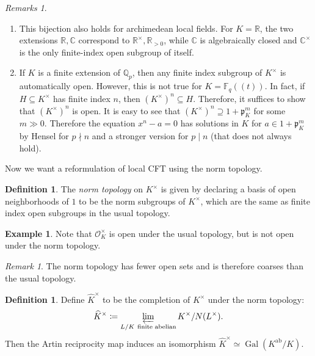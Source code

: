 \documentclass[leqno, openany]{memoir}
\theoremstyle{definition}
\newtheorem{defn}[thm]{Definition}
\newtheorem{exm}[thm]{Example}
\theoremstyle{remark}
\newtheorem{rmk}[thm]{Remark}
\newtheorem{rmks}[thm]{Remarks}
\theoremstyle{plain}
\theoremstyle{definition}
\theoremstyle{remark}
\newcommand{\R}{\mathbb{R}}
\newcommand{\F}{\mathbb{F}}
\newcommand{\C}{\mathbb{C}}
\newcommand{\Q}{\mathbb{Q}}
\newcommand{\mc}[1]{\mathcal{#1}}
\newcommand{\mf}[1]{\mathfrak{#1}}
\newcommand{\mr}[1]{\mathrm{#1}}
\newcommand{\wh}[1]{\widehat{#1}}
\DeclareMathOperator{\Gal}{Gal}
\begin{document}
\begin{rmks}\leavevmode
    \begin{enumerate}
        \item This bijection also holds for archimedean local fields. For $K = \R$, the two extensions $\R, \C$ correspond to $\R^{\times}, \R_{>0}$, while $\C$ is algebraically closed and $\C^{\times}$ is the only finite-index open subgroup of itself.
        \item If $K$ is a finite extension of $\Q_p$, then any finite index subgroup of $K^{\times}$ is automatically open. However, this is not true for $K = \F_q((t))$. In fact, if $H \subseteq K^{\times}$ has finite index $n$, then ${(K^{\times})}^n \subseteq H$. Therefore, it suffices to show that ${(K^{\times})}^n$ is open. It is easy to see that ${(K^{\times})}^n \supseteq 1 + \mf{p}_K^m$ for some $m \gg 0$. Therefore the equation $x^n - a = 0$ has solutions in $K$ for $a \in 1 + \mf{p}_K^m$ by Hensel for $p \nmid n$ and a stronger version for $p \mid n$ (that does not always hold).
    \end{enumerate}
\end{rmks}

Now we want a reformulation of local CFT using the norm topology.

\begin{defn}
    The \textit{norm topology} on $K^{\times}$ is given by declaring a basis of open neighborhoods of $1$ to be the norm subgroups of $K^{\times}$, which are the same as finite index open subgroups in the usual topology.
\end{defn}

\begin{exm}
    Note that $\mc{O}_K^{\times}$ is open under the usual topology, but is not open under the norm topology.
\end{exm}

\begin{rmk}
    The norm topology has fewer open sets and is therefore coarses than the usual topology.
\end{rmk}

\begin{defn}
    Define $\wh{K}^{\times}$ to be the completion of $K^{\times}$ under the norm topology:
    \[ \wh{K}^{\times} \coloneqq \varprojlim_{L/K\ \text{finite abelian}} K^{\times}/N(L^{\times}). \]
    Then the Artin reciprocity map induces an isomorphism $\wh{K}^{\times} \simeq \Gal(K^{\mr{ab}}/K)$.
\end{defn}
\end{document}
